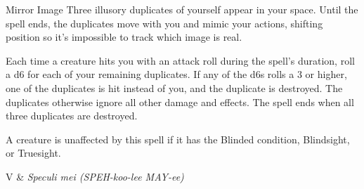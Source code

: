 \begin{Spell}[
  level=2nd,
  time=1 Action,
  range=Self,
  components={V, S},
  duration=1 Minute,
  school=Illusion,
  attack=None,
  effect=Deception
]{Mirror Image}
Three illusory duplicates of yourself appear in your space. Until the spell ends, the duplicates move with you and mimic your actions, shifting position so it's impossible to track which image is real.

Each time a creature hits you with an attack roll during the spell's duration, roll a d6 for each of your remaining duplicates. If any of the d6s rolls a 3 or higher, one of the duplicates is hit instead of you, and the duplicate is destroyed. The duplicates otherwise ignore all other damage and effects. The spell ends when all three duplicates are destroyed.

A creature is unaffected by this spell if it has the Blinded condition, Blindsight, or Truesight.

\begin{components}
V & \textit{Speculi mei (SPEH-koo-lee MAY-ee)}
\end{components}
\end{Spell}


